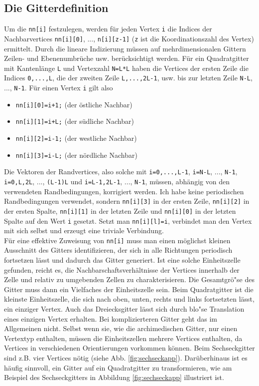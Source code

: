 \subsection{Die Gitterdefinition}
Um die \texttt{nn[i]} festzulegen, werden f\"ur jeden Vertex \texttt{i} die Indices der Nachbarvertices \texttt{nn[i][0]}, ..., \texttt{n[i][z-1]} (\texttt{z} ist die Koordinationszahl des Vertex) ermittelt. Durch die lineare Indizierung m\"ussen auf mehrdimensionalen Gittern Zeilen- und Ebenenumbr\"uche usw. ber\"ucksichtigt werden. F\"ur ein Quadratgitter mit Kantenl\"ange \texttt{L} und Vertexzahl \texttt{N=L*L} haben die Vertices der ersten Zeile die Indices \texttt{0,...,L}, die der zweiten Zeile  \texttt{L,...,2L-1}, usw. bis zur letzten Zeile \texttt{N-L}, ..., \texttt{N-1}. F\"ur einen Vertex \texttt{i} gilt also 
\begin{itemize}
\item{\texttt{nn[i][0]=i+1;}} (der \"ostliche Nachbar)
\item{\texttt{nn[i][1]=i+L;}} (der s\"udliche Nachbar)
\item{\texttt{nn[i][2]=i-1;}} (der westliche Nachbar)
\item{\texttt{nn[i][3]=i-L;}} (der n\"ordliche Nachbar)
\end{itemize}
Die Vektoren der Randvertices, also solche mit \texttt{i=0,...,L-1}, \texttt{i=N-L}, ..., \texttt{N-1}, \texttt{i=0,L,2L}, ..., \texttt{(L-1)L} und \texttt{i=L-1,2L-1}, ..., \texttt{N-1}, m\"ussen, abh\"angig von den verwendeten Randbedingungen, korrigiert werden. Ich habe keine periodischen Randbedingungen verwendet, sondern \texttt{nn[i][3]} in der ersten Zeile, \texttt{nn[i][2]} in der ersten Spalte, \texttt{nn[i][1]} in der letzten Zeile und \texttt{nn[i][0]} in der letzten Spalte auf den Wert \texttt{i} gesetzt. Setzt man \texttt{nn[i][l]=i}, verbindet man den Vertex mit sich selbst und erzeugt eine triviale Verbindung.\\
F\"ur eine effektive Zuweisung von \texttt{nn[i]} muss man einen m\"oglichst kleinen Ausschnitt des Gitters identifizieren, der sich in alle Richtungen periodisch fortsetzen l\"asst und dadurch das Gitter generiert. Ist eine solche Einheitszelle gefunden, reicht es, die Nachbarschaftsverh\"altnisse der Vertices innerhalb der Zelle und relativ zu umgebenden Zellen zu charakterisieren. Die Gesamtgr\"o"se des Gitter muss dann ein Vielfaches der Einheitszelle sein. Beim Quadratgitter ist die kleinste Einheitszelle, die sich nach oben, unten, rechts und links fortsetzten l\"asst, ein einziger Vertex. Auch das Dreiecksgitter l\"asst sich durch blo"se Translation eines einzigen Vertex erhalten. Bei komplizierteren Gitter geht das im Allgemeinen nicht. Selbst wenn sie, wie die archimedischen Gitter, nur einen Vertextyp enthalten, m\"ussen die Einheitszellen mehrere Vertices enthalten, da Vertices in verschiedenen Orientierungen vorkommen k\"onnen. Beim Sechseckgitter sind z.B. vier Vertices n\"otig (siehe Abb. \ref{fig:sechseckapp}). Dar\"uberhinaus ist es h\"aufig sinnvoll, ein Gitter auf ein Quadratgitter zu transformieren, wie am Beispiel des Sechseckgitters in Abbildung \ref{fig:sechseckapp} illustriert ist.
